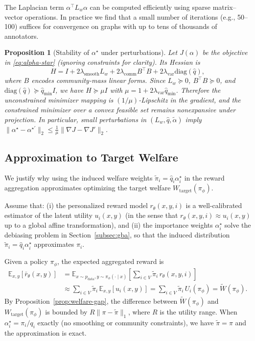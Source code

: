 \documentclass{article}
\theoremstyle{plain}
\newtheorem{proposition}[theorem]{Proposition}
\theoremstyle{definition}
\theoremstyle{remark}
\begin{document}
The Laplacian term $\alpha^\top L_w \alpha$ can be computed efficiently using
sparse matrix--vector operations. In practice we find that a small number of
iterations (e.g., 50--100) suffices for convergence on graphs with up to tens
of thousands of annotators.

\begin{proposition}[Stability of $\alpha^\star$ under perturbations]
\label{prop:alpha-stability}
Let $J(\alpha)$ be the objective in \eqref{eq:alpha-star} (ignoring
constraints for clarity). Its Hessian is
\[
    H = I + 2\lambda_{\mathrm{smooth}} L_w
      + 2\lambda_{\mathrm{comm}} B^\top B
      + 2\lambda_{\mathrm{var}} \mathrm{diag}(\hat q),
\]
where $B$ encodes community-mass linear forms. Since $L_w \succeq 0$,
$B^\top B \succeq 0$, and
$\mathrm{diag}(\hat q) \succeq \hat q_{\min} I$, we have
$H \succeq \mu I$ with $\mu = 1 + 2\lambda_{\mathrm{var}} \hat q_{\min}$.
Therefore the unconstrained minimizer mapping is $(1/\mu)$-Lipschitz in
the gradient, and the constrained minimizer over a convex feasible set
remains nonexpansive under projection. In particular, small perturbations
in $(L_w, \hat q, \tilde\alpha)$ imply
$\|\alpha^\star - \alpha^{\star\prime}\|_2 \le
\frac{1}{\mu} \|\nabla J - \nabla J'\|_2$.
\end{proposition}

\subsection{Approximation to Target Welfare}
\label{app:welfare-approx}

We justify why using the induced welfare weights $\tilde\pi_i = \hat q_i \alpha_i^\star$
in the reward aggregation approximates optimizing the target welfare
$W_{\text{target}}(\pi_\phi)$.

Assume that:
(i) the personalized reward model $r_\theta(x,y,i)$ is a well-calibrated
estimator of the latent utility $u_i(x,y)$ (in the sense that
$r_\theta(x,y,i) \approx u_i(x,y)$ up to a global affine transformation),
and (ii) the importance weights $\alpha_i^\star$ solve the debiasing problem in
Section~\ref{subsec:gba}, so that the induced distribution
$\tilde\pi_i = \hat q_i \alpha_i^\star$ approximates $\pi_i$.

Given a policy $\pi_\phi$, the expected aggregated reward is
\begin{align}
    \mathbb{E}_{x,y}\!\left[ \bar r_\theta(x,y) \right]
    &= \mathbb{E}_{x \sim p_{\text{data}}, y \sim \pi_\phi(\cdot \mid x)}
    \left[ \sum_{i \in V} \tilde\pi_i \, r_\theta(x,y,i) \right] \nonumber
    \\
    &\approx
    \sum_{i \in V} \tilde\pi_i \,
    \mathbb{E}_{x,y} \left[ u_i(x,y) \right]
    =
    \sum_{i \in V} \tilde\pi_i \, U_i(\pi_\phi)
    =
    \widetilde{W}(\pi_\phi).
\end{align}
By Proposition~\ref{prop:welfare-gap}, the difference between
$\widetilde{W}(\pi_\phi)$ and $W_{\text{target}}(\pi_\phi)$ is bounded by
$R \|\pi - \tilde\pi\|_1$, where $R$ is the utility range. When
$\alpha_i^\star = \pi_i / q_i$ exactly (no smoothing or community constraints),
we have $\tilde\pi = \pi$ and the approximation is exact.
\end{document}
